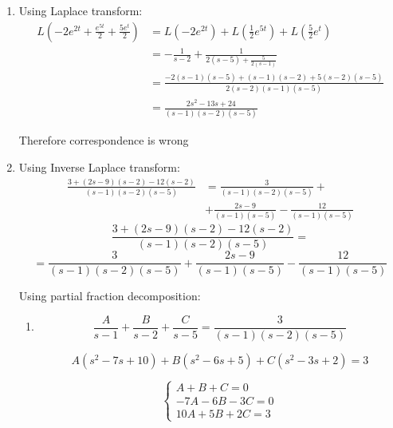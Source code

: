 \begin{enumerate}
    \item Using Laplace transform:
        \begin{displaymath}
            \begin{aligned}
                L(-2e^{2t} + \frac{e^{5t}}{2} + \frac{5e^t}{2}) & = L(-2e^{2t}) + L(\frac{1}{2} e^{5t}) + L(\frac{5}{2} e^t) \\
                & = -\frac{1}{s - 2} + \frac{1}{2(s - 5) + \frac{5}{2(s - 1)}} \\
                & = \frac{-2(s - 1)(s - 5) + (s - 1)(s - 2) + 5(s - 2)(s - 5)}{2(s - 2)(s - 1)(s - 5)} \\
                & = \frac{2s^2 - 13s + 24}{(s - 1)(s - 2)(s - 5)}
            \end{aligned}
        \end{displaymath}

        Therefore correspondence is wrong
    
    \item Using Inverse Laplace transform:
        \begin{displaymath}
            \begin{aligned}
                \frac{3 + (2s - 9)(s - 2) - 12(s - 2)}{(s - 1)(s - 2)(s - 5)} & = \frac{3}{(s - 1)(s - 2)(s - 5)} + \\
                & + \frac{2s - 9}{(s - 1)(s - 5)} - \frac{12}{(s - 1)(s - 5)}
            \end{aligned}
        \end{displaymath}
        \[\frac{3 + (2s - 9)(s - 2) - 12(s - 2)}{(s - 1)(s - 2)(s - 5)} = \]
        \[ = \frac{3}{(s - 1)(s - 2)(s - 5)} + \frac{2s - 9}{(s - 1)(s - 5)} - \frac{12}{(s - 1)(s - 5)}\]

        Using partial fraction decomposition:
        \begin{enumerate}
            \item
                \[\frac{A}{s - 1} + \frac{B}{s - 2} + \frac{C}{s - 5} = \frac{3}{(s - 1)(s - 2)(s - 5)}\]

                \[A(s^2 - 7s + 10) + B(s^2 - 6s + 5) + C(s^2 - 3s + 2) = 3\]

                \begin{displaymath}
                    \begin{cases}
                        A + B + C = 0 \\
                        -7A -6B - 3C = 0 \\
                        10A + 5B + 2C = 3
                    \end{cases}
                \end{displaymath}


\end{enumerate}
\end{enumerate}
